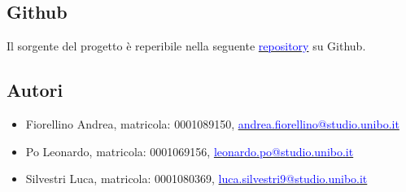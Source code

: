 \documentclass{article}
\begin{document}
\subsection{Github}
Il sorgente del progetto è reperibile nella seguente \href{https://github.com/aNdReA9111/PandOS.git}{\textcolor{blue}{repository}} su Github.

\subsection{Autori}
\begin{itemize}
    \item Fiorellino Andrea, matricola: 0001089150, \href{mailto:andrea.fiorellino@studio.unibo.it}{\textcolor{blue}{andrea.fiorellino@studio.unibo.it}}
    \item Po Leonardo, matricola: 0001069156, \href{mailto:leonardo.po@studio.unibo.it}{\textcolor{blue}{leonardo.po@studio.unibo.it}}
    \item Silvestri Luca, matricola: 0001080369, \href{mailto:luca.silvestri9@studio.unibo.it}{\textcolor{blue}{luca.silvestri9@studio.unibo.it}}
\end{itemize}
\end{document}
